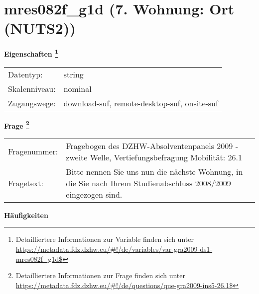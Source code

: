
    \setcounter{footnote}{0}

    \vspace*{-1.8cm}
	\section{mres082f\_g1d (7. Wohnung: Ort (NUTS2))}
	\label{section:mres082f_g1d}



    \vspace*{0.5cm}
    \noindent\textbf{Eigenschaften
	\footnote{Detailliertere Informationen zur Variable finden sich unter
		\url{https://metadata.fdz.dzhw.eu/\#!/de/variables/var-gra2009-ds1-mres082f_g1d$}}}\\
	\begin{tabularx}{\hsize}{@{}lX}
	Datentyp: & string \\
	Skalenniveau: & nominal \\
	Zugangswege: &
	  download-suf, 
	  remote-desktop-suf, 
	  onsite-suf
 \\
    \end{tabularx}



				\vspace*{0.5cm}
                \noindent\textbf{Frage
	                \footnote{Detailliertere Informationen zur Frage finden sich unter
		              \url{https://metadata.fdz.dzhw.eu/\#!/de/questions/que-gra2009-ins5-26.1$}}}\\
				\begin{tabularx}{\hsize}{@{}lX}
					Fragenummer: &
					  Fragebogen des DZHW-Absolventenpanels 2009 - zweite Welle, Vertiefungsbefragung Mobilität:
					  26.1
 \\
					Fragetext: & Bitte nennen Sie uns nun die nächste Wohnung, in die Sie nach Ihrem Studienabschluss 2008/2009 eingezogen sind. \\
				\end{tabularx}





        		\vspace*{0.5cm}
                \noindent\textbf{Häufigkeiten}

